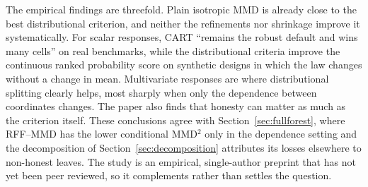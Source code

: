 \documentclass[12pt,a4paper]{article}
\newcommand{\1}{\mathbf 1}
\begin{document}
The empirical findings are threefold. Plain isotropic MMD is already close to the best distributional criterion, and neither the refinements nor shrinkage improve it systematically. For scalar responses, CART ``remains the robust default and wins many cells'' on real benchmarks, while the distributional criteria improve the continuous ranked probability score on synthetic designs in which the law changes without a change in mean. Multivariate responses are where distributional splitting clearly helps, most sharply when only the dependence between coordinates changes. The paper also finds that honesty can matter as much as the criterion itself. These conclusions agree with Section~\ref{sec:fullforest}, where RFF--MMD has the lower conditional MMD$^2$ only in the dependence setting and the decomposition of Section~\ref{sec:decomposition} attributes its losses elsewhere to non-honest leaves. The study is an empirical, single-author preprint that has not yet been peer reviewed, so it complements rather than settles the question.
\end{document}
